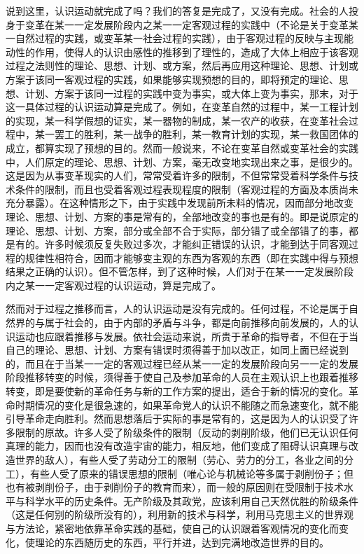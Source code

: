 \documentclass[UTF8, 12pt, a4paper]{ctexrep}
\begin{document}
说到这里，认识运动就完成了吗？我们的答复是完成了，又没有完成。社会的人投身于变革在某一一定发展阶段内之某一一定客观过程的实践中（不论是关于变革某一自然过程的实践，或变革某一社会过程的实践），由于客观过程的反映与主现能动性的作用，使得人的认识由感性的推移到了理性的，造成了大体上相应于该客观过程之法则性的理论、思想、计划、或方案，然后再应用这种理论、思想、计划或方案于该同一客观过程的实践，如果能够实现预想的目的，即将预定的理论、思想、计划、方案于该同一过程的实践中变为事实，或大体上变为事实，那末，对于这一具体过程的认识运动算是完成了。例如，在变革自然的过程中，某一工程计划的实现，某一科学假想的证实，某一器物的制成，某一农产的收获，在变革社会过程中，某一罢工的胜利，某一战争的胜利，某一教育计划的实现，某一救国团体的成立，都算实现了预想的目的。然而一般说来，不论在变革自然或变革社会的实践中，人们原定的理论、思想、计划、方案，毫无改变地实现出来之事，是很少的。这是因为从事变革现实的人们，常常受着许多的限制，不但常常受着科学条件与技术条件的限制，而且也受着客观过程表现程度的限制（客观过程的方面及本质尚未充分暴露）。在这种情形之下，由于实践中发现前所未料的情况，因而部分地改变理论、思想、计划、方案的事是常有的，全部地改变的事也是有的。即是说原定的理论、思想、计划、方案，部分或全部不合于实际，部分错了或全部错了的事，都是有的。许多时候须反复失败过多次，才能纠正错误的认识，才能到达于同客观过程的规律性相符合，因而才能够变主观的东西为客观的东西（即在实践中得与预想结果之正确的认识）。但不管怎样，到了这种时候，人们对于在某一一定发展阶段内之某一一定客观过程的认识运动，算是完成了。

然而对于过程之推移而言，人的认识运动是没有完成的。任何过程，不论是属于自然界的与属于社会的，由于内部的矛盾与斗争，都是向前推移向前发展的，人的认识运动也应跟着推移与发展。依社会运动来说，所贵于革命的指导者，不但在于当自己的理论、思想、计划、方案有错误时须得善于加以改正，如同上面已经说到的，而且在于当某一一定的客观过程已经从某一一定的发展阶段向另一一定的发展阶段推移转变的时候，须得善于使自己及参加革命的人员在主观认识上也跟着推移转变，即是要使新的革命任务与新的工作方案的提出，适合于新的情况的变化。革命时期情况的变化是很急速的，如果革命党人的认识不能随之而急速变化，就不能引导革命走向胜利。然而思想落后于实际的事是常有的，这是因为人的认识受了许多限制的原故。许多人受了阶级条件的限制（反动的剥削阶级，他们已无认识任何真理的能力，因而也没有改造宇宙的能力，相反地，他们变成了阻碍认识真理与改造世界的敌人），有些人受了劳动分工的限制（劳心、劳力的分工，各业之间的分工），有些人受了原来的错误思想的限制（唯心论与机械论等多属于剥削份子；但也有被剥削份子，由于剥削份子的教育而来），而一般的原因则在受限制于技术水平与科学水平的历史条件。无产阶级及其政党，应该利用自己天然优胜的阶级条件（这是任何别的阶级所没有的），利用新的技术与科学，利用马克思主义的世界观与方法论，紧密地依靠革命实践的基础，使自己的认识跟着客观情况的变化而变化，使理论的东西随历史的东西，平行并进，达到完满地改造世界的目的。
\end{document}

